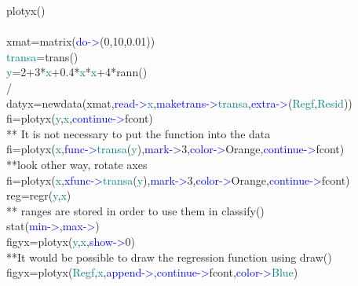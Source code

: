 \singlespacing 
\begin{example}[plotyxex]plotyx()\\ 
\label{plotyxex} 
\\ 
xmat=\textcolor{VioletRed}{matrix}(\textcolor{blue}{do->}(0,10,0.01))\\ 
\textcolor{teal}{transa}=\textcolor{VioletRed}{trans}()\\ 
\textcolor{teal}{y}=2+3*\textcolor{teal}{x}+0.4*\textcolor{teal}{x}*\textcolor{teal}{x}+4*\textcolor{VioletRed}{rann}()\\ 
/                                                                                                                      \\ 
datyx=\textcolor{VioletRed}{newdata}(xmat,\textcolor{blue}{read->}\textcolor{teal}{x},\textcolor{blue}{maketrans->}\textcolor{teal}{transa},\textcolor{blue}{extra->}(\textcolor{teal}{Regf},\textcolor{teal}{Resid}))\\ 
fi=\textcolor{VioletRed}{plotyx}(\textcolor{teal}{y},\textcolor{teal}{x},\textcolor{blue}{continue->}fcont)\\ 
{\color{ForestGreen}** It is not necessary to put the function into the data}\\ 
fi=\textcolor{VioletRed}{plotyx}(\textcolor{teal}{x},\textcolor{blue}{func->}\textcolor{teal}{transa}(\textcolor{teal}{y}),\textcolor{blue}{mark->}3,\textcolor{blue}{color->}Orange,\textcolor{blue}{continue->}fcont)\\ 
{\color{ForestGreen}**look other way, rotate axes}\\ 
fi=\textcolor{VioletRed}{plotyx}(\textcolor{teal}{x},\textcolor{blue}{xfunc->}\textcolor{teal}{transa}(\textcolor{teal}{y}),\textcolor{blue}{mark->}3,\textcolor{blue}{color->}Orange,\textcolor{blue}{continue->}fcont)\\ 
reg=\textcolor{VioletRed}{regr}(\textcolor{teal}{y},\textcolor{teal}{x})\\ 
{\color{ForestGreen}** ranges are stored in order to use them in classify()}\\ 
\textcolor{VioletRed}{stat}(\textcolor{blue}{min->},\textcolor{blue}{max->})\\ 
figyx=\textcolor{VioletRed}{plotyx}(\textcolor{teal}{y},\textcolor{teal}{x},\textcolor{blue}{show->}0)\\ 
{\color{ForestGreen}**It would be possible to draw the regression function using draw()}\\ 
figyx=\textcolor{VioletRed}{plotyx}(\textcolor{teal}{Regf},\textcolor{teal}{x},\textcolor{blue}{append->},\textcolor{blue}{continue->}fcont,\textcolor{blue}{color->}\textcolor{teal}{Blue})\\ 

\end{example}
